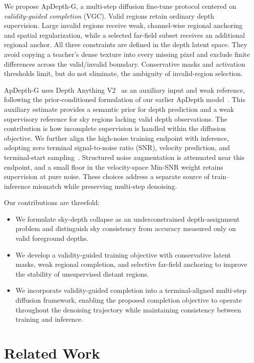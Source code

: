 \documentclass[10pt,journal,a4paper]{IEEEtran}
\begin{document}
We propose ApDepth-G, a multi-step diffusion fine-tune protocol centered on \emph{validity-guided completion} (VGC). 
Valid regions retain ordinary depth supervision. Large invalid regions receive weak, channel-wise regional anchoring and 
spatial regularization, while a selected far-field subset receives an additional regional anchor. 
All three constraints are defined in the depth latent space. They avoid copying a teacher's dense texture into 
every missing pixel and exclude finite differences across the valid/invalid boundary. Conservative masks and activation thresholds limit, but do not eliminate, the ambiguity of invalid-region selection.

ApDepth-G uses Depth Anything V2~\cite{Li2024DepthV2} as an auxiliary input and weak reference, 
following the prior-conditioned formulation of our earlier ApDepth model~\cite{wang2026apdepth}. 
This auxiliary estimate provides a semantic prior for depth prediction and a weak supervisory reference for sky regions lacking valid depth observations. 
The contribution is how incomplete supervision is handled within the diffusion objective. 
We further align the high-noise training endpoint with inference, adopting zero terminal signal-to-noise ratio (SNR), 
velocity prediction, and terminal-start sampling~\cite{lin2024common}. Structured noise augmentation is attenuated near 
this endpoint, and a small floor in the velocity-space Min-SNR weight retains supervision at pure noise. 
These choices address a separate source of train--inference mismatch while preserving multi-step denoising.

Our contributions are threefold:
\begin{itemize}
	\item We formulate sky-depth collapse as an underconstrained depth-assignment problem and distinguish sky consistency from accuracy measured only on valid foreground depths.
	\item We develop a validity-guided training objective with conservative latent masks, weak regional completion, and selective far-field anchoring to improve the stability of unsupervised distant regions.
	\item We incorporate validity-guided completion into a terminal-aligned multi-step diffusion framework, enabling the proposed completion objective to operate throughout the denoising trajectory while maintaining consistency between training and inference.
\end{itemize}

\section{Related Work}
\label{sec:related_work}
\end{document}

